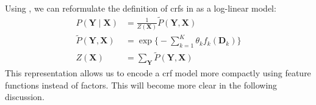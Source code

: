 \bigskip

Using , we can reformulate the definition of \glspl{crf} in  as a \gls{log-linear model}:
\begin{equation}
  \label{equ:crf-log-linear}
  \begin{split}
    P(\bm{Y}\mid\bm{X}) & = \frac{1}{Z(\bm{X})}\tilde{P}(\bm{Y},\bm{X}) \\
    \tilde{P}(\bm{Y},\bm{X}) & = \exp\Bigg\{ -\sum_{k=1}^K \theta_k f_k(\bm{D}_k)\Bigg\} \\
    Z(\bm{X}) & = \sum_{\bm{Y}}\tilde{P}(\bm{Y},\bm{X})
  \end{split}
\end{equation}
This representation allows us to encode a \gls{crf} model more compactly using \glspl{feature function} instead of \glspl{factor}.
This will become more clear in the following discussion.

\bigskip

